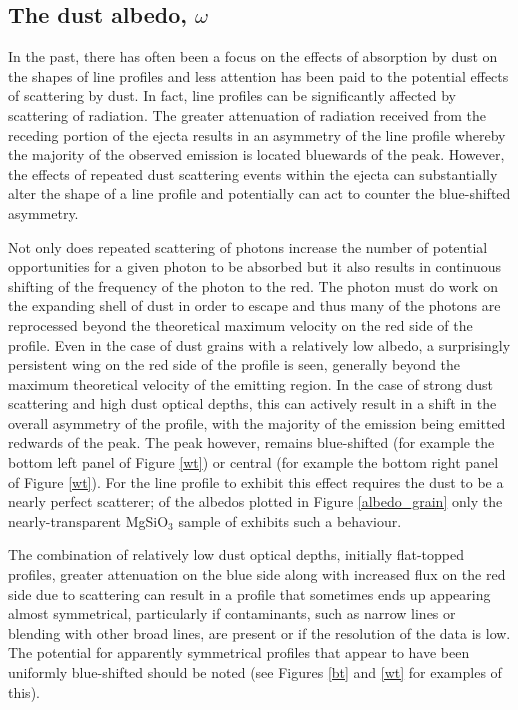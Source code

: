 \subsection{The dust albedo, $\omega$}
\label{omega}

In the past, there has often been a focus on the effects of absorption by 
dust on the shapes of line profiles and less attention has been paid to 
the potential effects of scattering by dust.  In fact, line profiles can 
be significantly affected by scattering of radiation.  The greater 
attenuation of radiation received from the receding portion of the ejecta 
results in an asymmetry of the line profile whereby the majority of the 
observed emission is located bluewards of the peak.  However, the effects 
of repeated dust scattering events within the ejecta can substantially 
alter the shape of a line profile and potentially can act to counter the 
blue-shifted asymmetry.

Not only does repeated scattering of photons increase the number of 
potential opportunities for a given photon to be absorbed but it also 
results in continuous shifting of the frequency of the photon to the red.  
The photon must do work on the expanding shell of dust in order to escape 
and thus many of the photons are reprocessed beyond the theoretical 
maximum velocity on the red side of the profile.  Even in the case of dust 
grains with a relatively low albedo, a surprisingly persistent wing on the 
red side of the profile is seen, generally beyond the maximum theoretical 
velocity of the emitting region. In the case of strong dust scattering and 
high dust optical depths, this can actively result in a shift in the 
overall asymmetry of the profile, with the majority of the emission being 
emitted redwards of the peak. The peak however, remains blue-shifted (for 
example the bottom left panel of Figure \ref{wt}) or central (for example 
the bottom right panel of Figure \ref{wt}).  For the line profile to 
exhibit this effect requires the dust to be a nearly perfect scatterer;
of the albedos plotted in Figure \ref{albedo_grain}
only the nearly-transparent MgSiO$_3$ sample of \citet{Jager2003}
exhibits such a behaviour.

The combination of relatively low dust optical depths, initially 
flat-topped profiles, greater attenuation on the blue side along with 
increased flux on the red side due to scattering can result in a profile 
that sometimes ends up appearing almost symmetrical, particularly if 
contaminants, such as narrow lines or blending with other broad lines, are 
present or if the resolution of the data is low.  The potential for 
apparently symmetrical profiles that appear to have been uniformly 
blue-shifted should be noted (see Figures \ref{bt} and \ref{wt} for 
examples of this).


